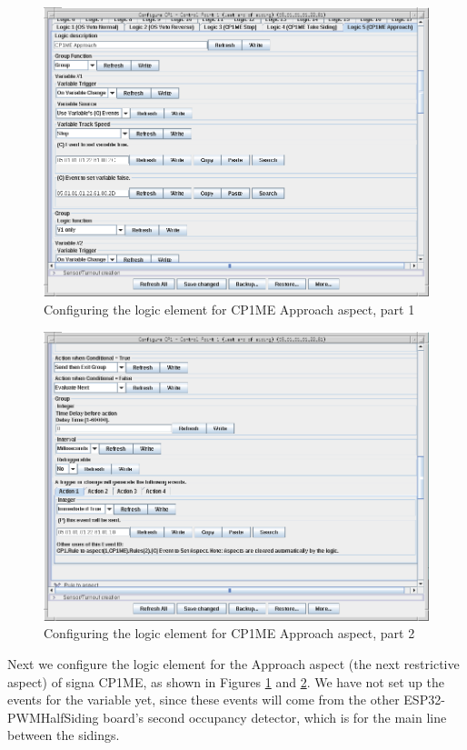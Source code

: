 \clearpage
\begin{figure}[hbpt]\begin{centering}%
\includegraphics[width=5in]{CP1ME-Approach-Logic-Config1.png}
\caption{Configuring the logic element for CP1ME Approach aspect, part 1}
\label{fig:CP1ME-Approach-Logic-Config1}
\end{centering}\end{figure}
\begin{figure}[hbpt]\begin{centering}%
\includegraphics[width=5in]{CP1ME-Approach-Logic-Config2.png}
\caption{Configuring the logic element for CP1ME Approach aspect, part 2}
\label{fig:CP1ME-Approach-Logic-Config2}
\end{centering}\end{figure}
Next we configure the logic element for the Approach aspect (the next 
restrictive aspect) of signa CP1ME, as shown in Figures 
\ref{fig:CP1ME-Approach-Logic-Config1} and 
\ref{fig:CP1ME-Approach-Logic-Config2}. We have not set up the events for the 
variable yet, since these events will come from the other ESP32-PWMHalfSiding 
board's second occupancy detector, which is for the main line between the 
sidings.

